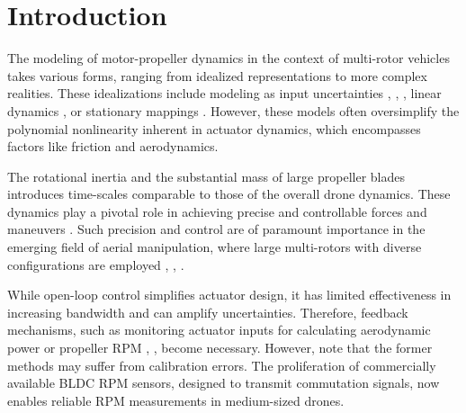 \section{Introduction}
\par The modeling of motor-propeller dynamics in the context of multi-rotor vehicles takes various forms, ranging from idealized representations to more complex realities. These idealizations include modeling as input uncertainties \cite{yacef2016observer}, \cite{liang2021geometric}, \cite{wang2018backpropagating}, linear dynamics \cite{pounds2010modelling}, or stationary mappings \cite{tayebi2006attitude}. However, these models often oversimplify the polynomial nonlinearity inherent in actuator dynamics, which encompasses factors like friction and aerodynamics.

The rotational inertia and the substantial mass of large propeller blades
introduces time-scales comparable to those of the overall drone dynamics. These
dynamics play a pivotal role in achieving precise and controllable forces and
maneuvers \cite{hamandi2021design}. Such precision and control are of
paramount importance in the emerging field of aerial manipulation, where large
multi-rotors with diverse configurations are employed \cite{ding2021design},
\cite{ryll20176d}, \cite{jiang2017estimation}.

While open-loop control simplifies actuator design, it has limited
effectiveness in increasing bandwidth \cite{charla2022enhancing} and can
amplify uncertainties. Therefore, feedback mechanisms, such as monitoring
actuator inputs for calculating aerodynamic power \cite{B_Manony} or propeller
RPM \cite{franchi2017adaptive}, \cite{bangura2017thrust}, become necessary.
However, note that the former methods may suffer from calibration errors. The
proliferation of commercially available BLDC RPM sensors, designed to transmit
commutation signals, now enables reliable RPM measurements in medium-sized
drones.

